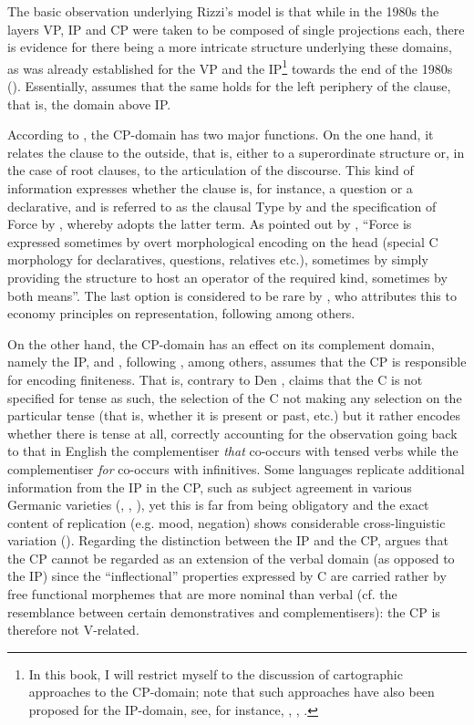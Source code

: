 The basic observation underlying Rizzi's model is that while in the 1980s the layers VP, IP and CP were taken to be composed of single projections each, there is evidence for there being a more intricate structure underlying these domains, as was already established for the VP and the IP\footnote{In this book, I will restrict myself to the discussion of cartographic approaches to the CP-domain; note that such approaches have also been proposed for the IP-domain, see, for instance, \citet{cinque1999}, \citet{belletti2004}, \citet{cardinaletti2004}.} towards the end of the 1980s (\citealt[281]{rizzi1997}). Essentially, \citet{rizzi1997} assumes that the same holds for the left periphery of the clause, that is, the domain above IP.

According to \citet[283]{rizzi1997}, the CP-domain has two major functions. On the one hand, it relates the clause to the outside, that is, either to a superordinate structure or, in the case of root clauses, to the articulation of the discourse. This kind of information expresses whether the clause is, for instance, a question or a declarative, and is referred to as the clausal Type by \citet{cheng1991diss} and the specification of Force by \citet{chomsky1995}, whereby \citet[283]{rizzi1997} adopts the latter term. As pointed out by \citet[283]{rizzi1997}, ``Force is expressed sometimes by overt morphological encoding on the head (special C morphology for declaratives, questions, relatives etc.), sometimes by simply providing the structure to host an operator of the required kind, sometimes by both means''. The last option is considered to be rare by \citet{rizzi1997}, who attributes this to economy principles on representation, following \citet{cheng1991diss} among others.

On the other hand, the CP-domain has an effect on its complement domain, namely the IP, and \citet[283--285]{rizzi1997}, following \citet{holmbergplatzack1988}, among others, assumes that the CP is responsible for encoding finiteness. That is, contrary to Den \citet{denbesten1983}, \citet[283--284]{rizzi1997} claims that the C is not specified for tense as such, the selection of the C not making any selection on the particular tense (that is, whether it is present or past, etc.) but it rather encodes whether there is tense at all, correctly accounting for the observation going back to \citet{chomskylasnik1977} that in English the complementiser \textit{that} co-occurs with tensed verbs while the complementiser \textit{for} co-occurs with infinitives. Some languages replicate additional information from the IP in the CP, such as subject agreement in various Germanic varieties (\citealt{haegeman1992}, \citealt{bayer1984}, \citealt{shlonsky1993}), yet this is far from being obligatory and the exact content of replication (e.g. mood, negation) shows considerable cross-linguistic variation (\citealt{rizzi1997}). Regarding the distinction between the IP and the CP, \citet[284--285]{rizzi1997} argues that the CP cannot be regarded as an extension of the verbal domain (as opposed to the IP) since the ``inflectional'' properties expressed by C are carried rather by free functional morphemes that are more nominal than verbal (cf. the resemblance between certain demonstratives and complementisers): the CP is therefore not V-related.

